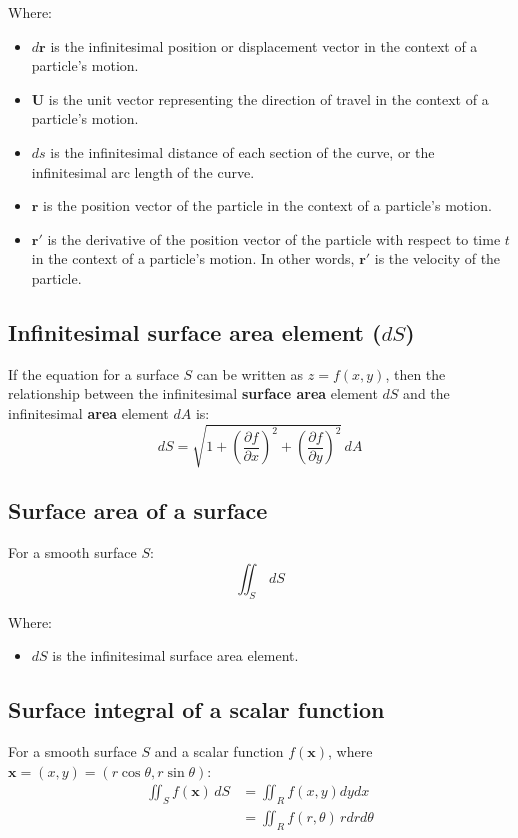 \documentclass[11pt]{article}
\begin{document}
Where:
\begin{itemize}
\item \(d \boldsymbol{r}\) is the infinitesimal position or displacement vector in the context of a particle's motion.
\item \(\boldsymbol{U}\) is the unit vector representing the direction of travel in the context of a particle's motion.
\item \(ds\) is the infinitesimal distance of each section of the curve, or the infinitesimal arc length of the curve.
\item \(\boldsymbol{r}\) is the position vector of the particle in the context of a particle's motion.
\item \(\boldsymbol{r'}\) is the derivative of the position vector of the particle with respect to time \(t\) in the context of a particle's motion. In other words, \(\boldsymbol{r'}\) is the velocity of the particle.
\end{itemize}

\subsection{Infinitesimal surface area element (\(dS\))}
\label{sec:org8742a32}
If the equation for a surface \(S\) can be written as \(z = f(x, y)\), then the relationship between the infinitesimal \textbf{surface area} element \(dS\) and the infinitesimal \textbf{area} element \(dA\) is:
\[dS = \sqrt{1 + \left(\frac{\partial f}{\partial x} \right)^2 + \left(\frac{\partial f}{\partial y} \right)^2} \, dA\]

\subsection{Surface area of a surface}
\label{sec:orgaf80b46}
For a smooth surface \(S\):
\[\iint_S \, dS\]

Where:
\begin{itemize}
\item \(dS\) is the infinitesimal surface area element.
\end{itemize}

\subsection{Surface integral of a scalar function}
\label{sec:org587aedd}
For a smooth surface \(S\) and a scalar function \(f(\boldsymbol{x})\), where \(\boldsymbol{x} = (x, y) = (r \cos \theta, r \sin \theta)\):
\begin{align*}
\iint_S f(\boldsymbol{x}) \, dS &= \iint_R f(x, y) dy dx \\
&= \iint_R f(r, \theta) \, r dr d \theta
\end{align*}
\end{document}
